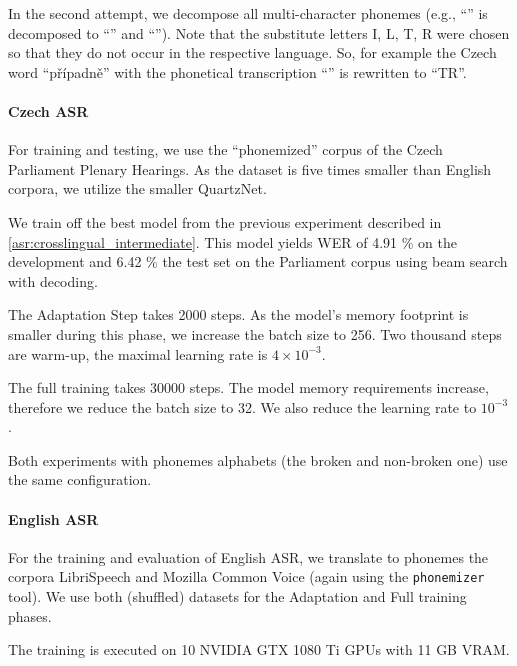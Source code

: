 In the second attempt, we decompose all multi-character phonemes (e.g., ``'' is decomposed to ``'' and ``'').  Note that the substitute letters I, L, T, R were chosen so that they do not occur in the respective language. So, for example the Czech word ``p\v{r}\'ipadn\v{e}'' with the phonetical transcription ``'' is rewritten to ``TR''.

\paragraph{Czech ASR}
For training and testing, we use the ``phonemized'' corpus of the Czech Parliament Plenary Hearings. As the dataset is five times smaller than English corpora, we utilize the smaller QuartzNet.

We train off the best model from the previous experiment described in \cref{asr:crosslingual_intermediate}. This model yields WER of 4.91 \% on the development and 6.42 \% the test set on the Parliament corpus using beam search with decoding.

The Adaptation Step takes 2000 steps. As the model's memory footprint is smaller during this phase, we increase the batch size to 256. Two thousand steps are warm-up, the maximal learning rate is $4 \times 10^{-3}$.

The full training takes 30000 steps. The model memory requirements increase, therefore we reduce the batch size to 32. We also reduce the learning rate to $10^{-3}$.

Both experiments with phonemes alphabets (the broken and non-broken one) use the same configuration.

\paragraph{English ASR}
For the training and evaluation of English ASR, we translate to pho\-ne\-mes the corpora LibriSpeech and Mozilla Common Voice (again using the \texttt{pho\-ne\-mi\-zer} tool). We use both (shuffled) datasets for the Adaptation and Full training phases.

The training is executed on 10 NVIDIA GTX 1080 Ti GPUs with 11 GB VRAM.

